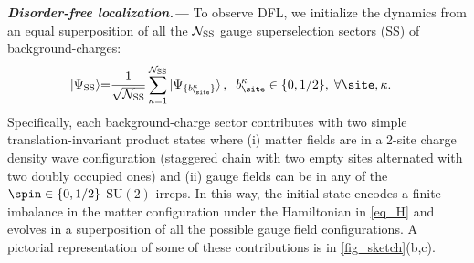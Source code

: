 \documentclass[aps,prl,reprint,twocolumn,superscriptaddress,floatfix,nofootinbib]{revtex4-2}
\begin{document}
\textbf{\textit{Disorder-free localization.---}}
To observe DFL, we initialize the dynamics from an equal superposition of all the $\mathcal{N}_{\rm{SS}}$ gauge superselection sectors (SS) of background-charges:
\begin{equation}
    \begin{split}
        \ket{\Psi_{\rm{SS}}}
         & {=}\frac{1}{\sqrt{\mathcal{N}_{\rm{SS}}}}\sum_{\kappa=1}^{\mathcal{N}_{\rm{SS}}}
        \ket{\Psi_{\{b^{\kappa}_{\site}\}}},\;\;
        b_{\site}^{\kappa}\in \qty{0,1/2},\; \forall \site, \kappa.
    \end{split}
    \label{eq_bg_superposition}
\end{equation}
Specifically, each background-charge sector contributes with two simple translation-invariant product states where (i) matter fields are in a 2-site charge density wave configuration (staggered chain with two empty sites alternated with two doubly occupied ones) and (ii) gauge fields can be in any of the $\spin\in\qty{0,1/2}$ $\mathrm{SU}(2)$ irreps.
In this way, the initial state encodes a finite imbalance in the matter configuration under the Hamiltonian in \cref{eq_H} and evolves in a superposition of all the possible gauge field configurations.
A pictorial representation of some of these contributions is in \cref{fig_sketch}(b,c).
\end{document}
